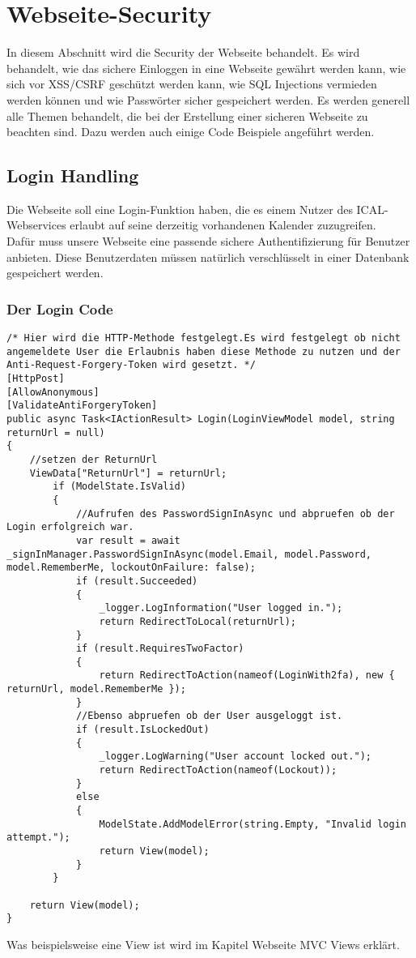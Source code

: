 \renewcommand{\theauthor}{Marcel Stering}
\chapter{Webseite-Security}
\label{sec:Security}
In diesem Abschnitt wird die Security der Webseite behandelt.
Es wird behandelt, wie das sichere Einloggen in eine Webseite gewährt werden kann, wie sich vor XSS/CSRF geschützt werden kann, wie SQL Injections vermieden werden können und wie Passwörter sicher gespeichert werden. Es werden generell alle Themen behandelt, die bei der Erstellung einer sicheren Webseite zu beachten sind. Dazu werden auch einige Code Beispiele angeführt werden.
\section{Login Handling}
\label{sec:Login}
Die Webseite soll eine Login-Funktion haben, die es einem Nutzer des ICAL-Webservices erlaubt auf seine derzeitig vorhandenen Kalender zuzugreifen.\\Dafür muss unsere Webseite eine passende sichere Authentifizierung für Benutzer anbieten. Diese Benutzerdaten müssen natürlich verschlüsselt in einer Datenbank gespeichert werden. 
\subsection{Der Login Code}
\label{sec:Login_Handling_Code}
\begin{lstlisting}[caption={Login}]
/* Hier wird die HTTP-Methode festgelegt.Es wird festgelegt ob nicht angemeldete User die Erlaubnis haben diese Methode zu nutzen und der Anti-Request-Forgery-Token wird gesetzt. */
[HttpPost]
[AllowAnonymous]
[ValidateAntiForgeryToken]
public async Task<IActionResult> Login(LoginViewModel model, string returnUrl = null)
{
	//setzen der ReturnUrl
    ViewData["ReturnUrl"] = returnUrl;
        if (ModelState.IsValid)
        {
        	//Aufrufen des PasswordSignInAsync und abpruefen ob der Login erfolgreich war.
            var result = await _signInManager.PasswordSignInAsync(model.Email, model.Password, model.RememberMe, lockoutOnFailure: false);
            if (result.Succeeded)
            {
                _logger.LogInformation("User logged in.");
                return RedirectToLocal(returnUrl);
            }
            if (result.RequiresTwoFactor)
            {
                return RedirectToAction(nameof(LoginWith2fa), new { returnUrl, model.RememberMe });
            }
            //Ebenso abpruefen ob der User ausgeloggt ist.
            if (result.IsLockedOut)
            {
                _logger.LogWarning("User account locked out.");
                return RedirectToAction(nameof(Lockout));
            }
            else
            {
                ModelState.AddModelError(string.Empty, "Invalid login attempt.");
                return View(model);
            }
        }

    return View(model);
}
\end{lstlisting}
Was beispielsweise eine View ist wird im Kapitel Webseite MVC Views erklärt. 
